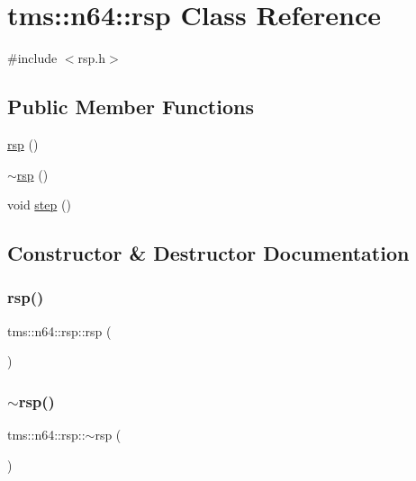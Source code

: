 \hypertarget{classtms_1_1n64_1_1rsp}{}\section{tms\+:\+:n64\+:\+:rsp Class Reference}
\label{classtms_1_1n64_1_1rsp}


{\ttfamily \#include $<$rsp.\+h$>$}

\subsection*{Public Member Functions}
\begin{DoxyCompactItemize}
\item 
\hyperlink{classtms_1_1n64_1_1rsp_a46d4f1397a5cbae88d3b225397e4269b}{rsp} ()
\item 
\hyperlink{classtms_1_1n64_1_1rsp_a0a23738f3c4cac3318619e2de83c9b83}{$\sim$rsp} ()
\item 
void \hyperlink{classtms_1_1n64_1_1rsp_aed71289fe4b870da977610ce5769a23f}{step} ()
\end{DoxyCompactItemize}


\subsection{Constructor \& Destructor Documentation}
\mbox{\label{classtms_1_1n64_1_1rsp_a46d4f1397a5cbae88d3b225397e4269b}} 
\subsubsection{\texorpdfstring{rsp()}{rsp()}}
{\footnotesize\ttfamily tms\+::n64\+::rsp\+::rsp (\begin{DoxyParamCaption}{ }\end{DoxyParamCaption})}

\mbox{\label{classtms_1_1n64_1_1rsp_a0a23738f3c4cac3318619e2de83c9b83}} 
\subsubsection{\texorpdfstring{$\sim$rsp()}{~rsp()}}
{\footnotesize\ttfamily tms\+::n64\+::rsp\+::$\sim$rsp (\begin{DoxyParamCaption}{ }\end{DoxyParamCaption})}



